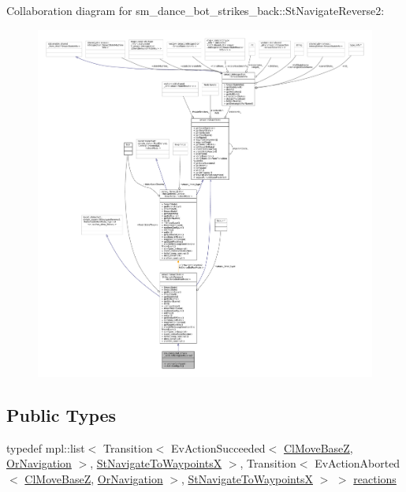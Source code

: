 Collaboration diagram for sm\+\_\+dance\+\_\+bot\+\_\+strikes\+\_\+back\+:\+:St\+Navigate\+Reverse2\+:
\nopagebreak
\begin{figure}[H]
\begin{center}
\leavevmode
\includegraphics[width=350pt]{structsm__dance__bot__strikes__back_1_1StNavigateReverse2__coll__graph}
\end{center}
\end{figure}
\subsection*{Public Types}
\begin{DoxyCompactItemize}
\item 
typedef mpl\+::list$<$ Transition$<$ Ev\+Action\+Succeeded$<$ \hyperlink{classmove__base__z__client_1_1ClMoveBaseZ}{Cl\+Move\+BaseZ}, \hyperlink{classsm__dance__bot__strikes__back_1_1OrNavigation}{Or\+Navigation} $>$, \hyperlink{structsm__dance__bot__strikes__back_1_1StNavigateToWaypointsX}{St\+Navigate\+To\+WaypointsX} $>$, Transition$<$ Ev\+Action\+Aborted$<$ \hyperlink{classmove__base__z__client_1_1ClMoveBaseZ}{Cl\+Move\+BaseZ}, \hyperlink{classsm__dance__bot__strikes__back_1_1OrNavigation}{Or\+Navigation} $>$, \hyperlink{structsm__dance__bot__strikes__back_1_1StNavigateToWaypointsX}{St\+Navigate\+To\+WaypointsX} $>$ $>$ \hyperlink{structsm__dance__bot__strikes__back_1_1StNavigateReverse2_a10192cd09cb494f317679544904218ee}{reactions}
\end{DoxyCompactItemize}
